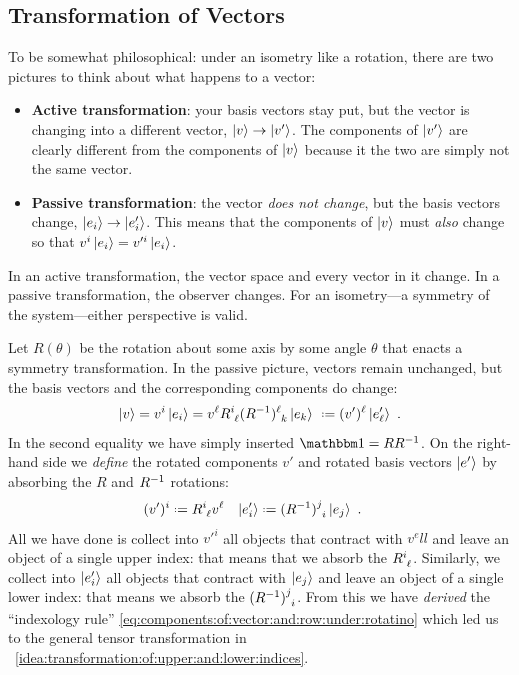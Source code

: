 \documentclass[12pt, oneside]{report}    %
\begin{document}
\subsection{Transformation of Vectors}

To be somewhat philosophical: under an isometry like a rotation, there are two pictures to think about what happens to a vector:
\begin{itemize}
    \item \textbf{Active transformation}: your basis vectors stay put, but the vector is changing into a different vector, $\left|v\right\rangle \to \left|v'\right\rangle$. The components of $\left|v'\right\rangle$ are clearly different from the components of $\left|v\right\rangle$ because it the two are simply not the same vector.
    \item \textbf{Passive transformation}: the vector \emph{does not change}, but the basis vectors change, $\left|e_i\right\rangle \to \left|e'_i\right\rangle$. This means that the components of $\left|v\right\rangle$ must \emph{also} change so that $v^i\left|e_i\right\rangle = v'^{i}\left|e_i\right\rangle$.
\end{itemize}
In an active transformation, the vector space and every vector in it change. In a passive transformation, the observer changes. For an isometry---a symmetry of the system---either perspective is valid. 
% 

Let $R(\theta)$ be the rotation about some axis by some angle $\theta$ that enacts a symmetry transformation. In the passive picture, vectors remain unchanged, but the basis vectors and the corresponding components do change:
\begin{align}
    \ket{v} = v^i \ket{e_i} =
    v^\ell R\aij{i}{\ell} (R\inv)\aij{\ell}{k}  \ket{e_k} \
    \defeq (v')^\ell \ket{e'_\ell}
    \ .
\end{align}
In the second equality we have simply inserted $\one = R R\inv$. On the right-hand side we \emph{define} the rotated components $v'$ and rotated basis vectors $\left|e'\right\rangle$ by absorbing the $R$ and $R^{-1}$ rotations:
\begin{align}
    (v')^i &\defeq R\aij{i}{\ell} v^\ell
    &
    \ket{e'_i} &\defeq  (R\inv)\aij{j}{i}\ket{e_j} \ .
    \label{eq:passive:transformation:of:vector:and:basis}
\end{align}
All we have done is collect into $v'^i$ all objects that contract with $v^ell$ and leave an object of a single upper index: that means that we absorb the $R\aij{i}{\ell}$. Similarly, we collect into $\left|e'_i\right\rangle$ all objects that contract with $\left|e_j\right\rangle$ and leave an object of a single lower index: that means we absorb the $(R\inv)\aij{j}{i}$. From this we have \emph{derived} the ``indexology rule'' \eqref{eq:components:of:vector:and:row:under:rotatino} which led us to the general tensor transformation in \bigidearef{}~\ref{idea:transformation:of:upper:and:lower:indices}.
\end{document}
